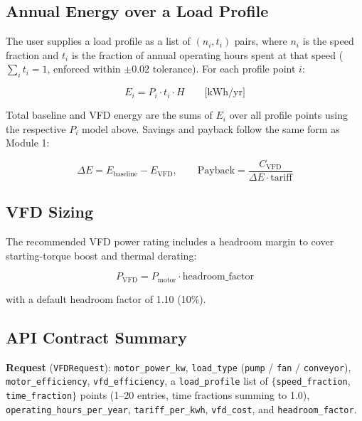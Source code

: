 \documentclass[11pt,a4paper]{article}
\newcommand{\code}[1]{\texttt{#1}}
\begin{document}
\subsection{Annual Energy over a Load Profile}

The user supplies a load profile as a list of $(n_i, t_i)$ pairs, where $n_i$
is the speed fraction and $t_i$ is the fraction of annual operating hours
spent at that speed ($\sum_i t_i = 1$, enforced within $\pm 0.02$ tolerance).
For each profile point $i$:

\begin{equation}
E_i = P_i \cdot t_i \cdot H \qquad \text{[kWh/yr]}
\end{equation}

Total baseline and VFD energy are the sums of $E_i$ over all profile points
using the respective $P_i$ model above. Savings and payback follow the same
form as Module 1:

\begin{equation}
\Delta E = E_{\mathrm{baseline}} - E_{\mathrm{VFD}}, \qquad
\mathrm{Payback} = \frac{C_{\mathrm{VFD}}}{\Delta E \cdot \mathrm{tariff}}
\end{equation}

\subsection{VFD Sizing}

The recommended VFD power rating includes a headroom margin to cover
starting-torque boost and thermal derating:

\begin{equation}
P_{\mathrm{VFD}} = P_{\mathrm{motor}} \cdot \mathrm{headroom\_factor}
\end{equation}

with a default headroom factor of 1.10 (10\%).

\subsection{API Contract Summary}

\textbf{Request} (\code{VFDRequest}): \code{motor\_power\_kw},
\code{load\_type} (\code{pump} / \code{fan} / \code{conveyor}),
\code{motor\_efficiency}, \code{vfd\_efficiency}, a \code{load\_profile}
list of $\{$\code{speed\_fraction}, \code{time\_fraction}$\}$ points (1--20
entries, time fractions summing to 1.0), \code{operating\_hours\_per\_year},
\code{tariff\_per\_kwh}, \code{vfd\_cost}, and \code{headroom\_factor}.
\end{document}
